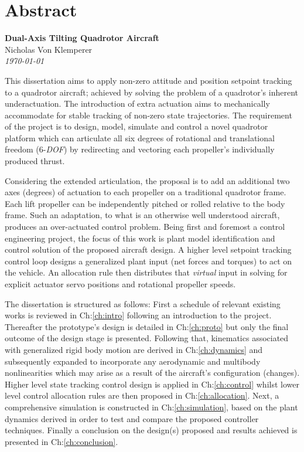 \documentclass[a4paper, 11pt, oneside, openright, parskip=full]{book}
\newcommand{\auth}{Nicholas Von Klemperer}								%
\newcommand{\titl}{Dual-Axis Tilting Quadrotor Aircraft}						%
\begin{document}
\chapter{Abstract}				
\label{ch:abs}
\begin{center}
	\textbf{\Large \titl}\\
			\vskip 0.2cm
			\auth\\
			\vskip 0.2cm
	\textit{\footnotesize\today}
			\vskip 1cm
\end{center}
This dissertation aims to apply non-zero attitude and position setpoint tracking to a quadrotor aircraft; achieved by solving the problem of a quadrotor's inherent underactuation. The introduction of extra actuation aims to mechanically accommodate for stable tracking of non-zero state trajectories. The requirement of the project is to design, model, simulate and control a novel quadrotor platform which can articulate all six degrees of rotational and translational freedom (6-\emph{DOF}) by redirecting and vectoring each propeller's individually produced thrust. 
\par
Considering the extended articulation, the proposal is to add an additional two axes (degrees) of actuation to each propeller on a traditional quadrotor frame. Each lift propeller can be independently pitched or rolled relative to the body frame. Such an adaptation, to what is an otherwise well understood aircraft, produces an over-actuated control problem. Being first and foremost a control engineering project, the focus of this work is plant model identification and control solution of the proposed aircraft design. A higher level setpoint tracking control loop designs a generalized plant input (net forces and torques) to act on the vehicle. An allocation rule then distributes that \emph{virtual} input in solving for explicit actuator servo positions and rotational propeller speeds.
\par
The dissertation is structured as follows: First a schedule of relevant existing works is reviewed in Ch:\ref{ch:intro} following an introduction to the project. Thereafter the prototype's design is detailed in Ch:\ref{ch:proto} but only the final outcome of the design stage is presented. Following that, kinematics associated with generalized rigid body motion are derived in Ch:\ref{ch:dynamics} and subsequently expanded to incorporate any aerodynamic and multibody nonlinearities which may arise as a result of the aircraft's configuration (changes). Higher level state tracking control design is applied in Ch:\ref{ch:control} whilst lower level control allocation rules are then proposed in Ch:\ref{ch:allocation}. Next, a comprehensive simulation is constructed in Ch:\ref{ch:simulation}, based on the plant dynamics derived in order to test and compare the proposed controller techniques. Finally a conclusion on the design(s) proposed and results achieved is presented in Ch:\ref{ch:conclusion}.
\end{document}
